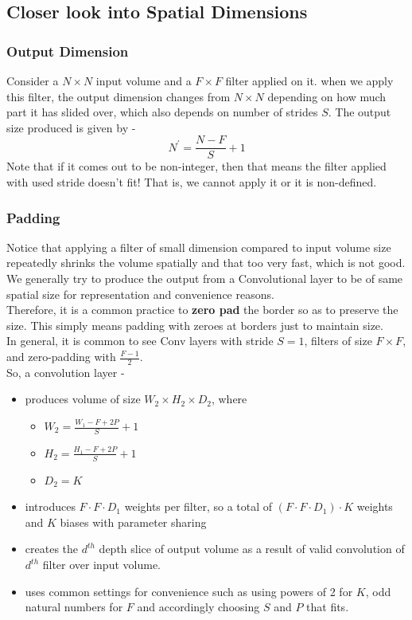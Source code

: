 \documentclass[12pt,a4paper]{article}
\begin{document}
\subsection{Closer look into Spatial Dimensions}
\subsubsection{Output Dimension}
Consider a $N \times N$ input volume and a $F \times F$ filter applied on it. when we apply this filter, the output dimension changes from $N \times N$ depending on how much part it has slided over, which also depends on number of strides $S$. The output size produced is given by -
\begin{equation*}
    N^\prime = \frac{N - F}{S} + 1
\end{equation*}
Note that if it comes out to be non-integer, then that means the filter applied with used stride doesn't fit! That is, we cannot apply it or it is non-defined.
\subsubsection{Padding}
Notice that applying a filter of small dimension compared to input volume size repeatedly shrinks the volume spatially and that too very fast, which is not good. We generally try to produce the output from a Convolutional layer to be of same spatial size for representation and convenience reasons. \\
Therefore, it is a common practice to \textbf{zero pad} the border so as to preserve the size. This simply means padding with zeroes at borders just to maintain size. \\ 
In general, it is common to see Conv layers with stride $S = 1$, filters of size $F \times F$, and zero-padding with $\frac{F-1}{2}$. \\
So, a convolution layer - 
\begin{itemize}
    \item produces volume of size $W_{2} \times H_{2} \times D_{2}$, where
    \begin{itemize}
        \item $W_{2} = \frac{W_{1} - F + 2P}{S} + 1$
        \item $H_{2} = \frac{H_{1} - F + 2P}{S} + 1$
        \item $D_{2} = K$
    \end{itemize}
    \item introduces $F \cdot F \cdot D_{1}$ weights per filter, so a total of $(F \cdot F \cdot D_{1}) \cdot K$ weights and $K$ biases with parameter sharing
    \item creates the $d^{th}$ depth slice of output volume as a result of valid convolution of $d^{th}$ filter over input volume.
    \item uses common settings for convenience such as using powers of 2 for $K$, odd natural numbers for $F$ and accordingly choosing $S$ and $P$ that fits.
\end{itemize}
\end{document}

